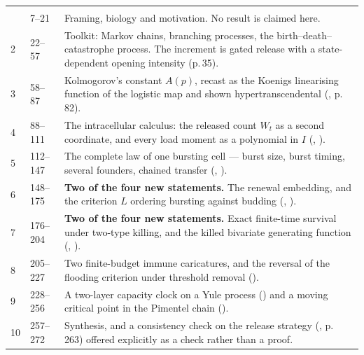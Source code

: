 
\vspace{0.15\baselineskip}
{\footnotesize
\begin{xltabular}{\linewidth}{@{}p{7mm}p{15mm}Z@{}}
\toprule
{} &  &  \\
\midrule
\endfirsthead
\toprule
{} &  &  \\
\midrule
\endhead
\bottomrule
{}  & 7--21    & Framing, biology and motivation. No result is claimed here. \\
2  & 22--57   & Toolkit: Markov chains, branching processes, the birth--death--catastrophe process. The increment is gated release with a state-dependent opening intensity (p.\,35). \\
3  & 58--87   & Kolmogorov's constant $A(p)$, recast as the Koenigs linearising function of the logistic map and shown hypertranscendental (, p.\,82). \\
4  & 88--111  & The intracellular calculus: the released count $W_t$ as a second coordinate, and every load moment as a polynomial in $I$ (, ). \\
5  & 112--147 & The complete law of one bursting cell --- burst size, burst timing, several founders, chained transfer (, ). \\
6  & 148--175 & \textbf{Two of the four new statements.} The renewal embedding, and the criterion $L$ ordering bursting against budding (, ). \\
7  & 176--204 & \textbf{Two of the four new statements.} Exact finite-time survival under two-type killing, and the killed bivariate generating function (, ). \\
8  & 205--227 & Two finite-budget immune caricatures, and the reversal of the flooding criterion under threshold removal (). \\
9  & 228--256 & A two-layer capacity clock on a Yule process () and a moving critical point in the Pimentel chain (). \\
10 & 257--272 & Synthesis, and a consistency check on the \yp{} release strategy (, p.\,263) offered explicitly as a check rather than a proof. \\
\end{xltabular}\par}
